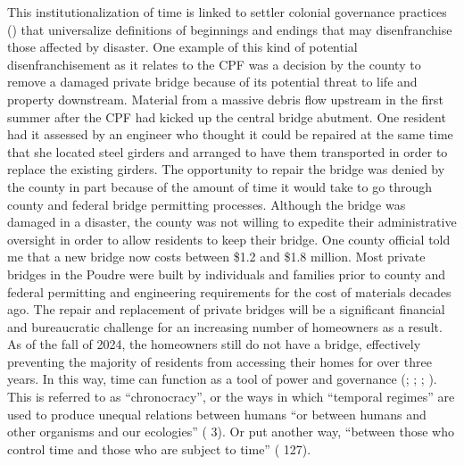 \documentclass[
]{article}
\begin{document}
This institutionalization of time is linked to settler colonial governance practices () that universalize definitions of beginnings and endings that may disenfranchise those affected by disaster. One example of this kind of potential disenfranchisement as it relates to the CPF was a decision by the county to remove a damaged private bridge because of its potential threat to life and property downstream. Material from a massive debris flow upstream in the first summer after the CPF had kicked up the central bridge abutment. One resident had it assessed by an engineer who thought it could be repaired at the same time that she located steel girders and arranged to have them transported in order to replace the existing girders. The opportunity to repair the bridge was denied by the county in part because of the amount of time it would take to go through county and federal bridge permitting processes. Although the bridge was damaged in a disaster, the county was not willing to expedite their administrative oversight in order to allow residents to keep their bridge. One county official told me that a new bridge now costs between \$1.2 and \$1.8 million. Most private bridges in the Poudre were built by individuals and families prior to county and federal permitting and engineering requirements for the cost of materials decades ago. The repair and replacement of private bridges will be a significant financial and bureaucratic challenge for an increasing number of homeowners as a result. As of the fall of 2024, the homeowners still do not have a bridge, effectively preventing the majority of residents from accessing their homes for over three years. In this way, time can function as a tool of power and governance (; ; ; ). This is referred to as ``chronocracy'', or the ways in which ``temporal regimes'' are used to produce unequal relations between humans ``or between humans and other organisms and our ecologies'' ( 3). Or put another way, ``between those who control time and those who are subject to time'' ( 127).
\end{document}
